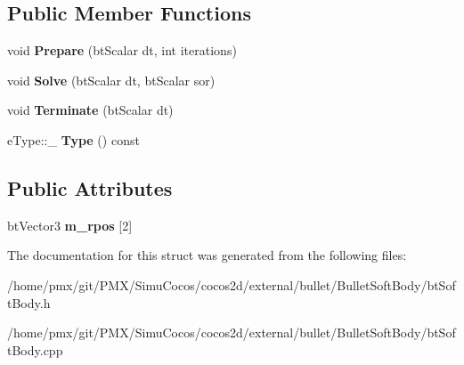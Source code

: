 \subsection*{Public Member Functions}
\begin{DoxyCompactItemize}
\item 
\mbox{\label{structbtSoftBody_1_1LJoint_aafb676d1a943fbce147eb4d8cf4c6a67}} 
void {\bfseries Prepare} (bt\+Scalar dt, int iterations)
\item 
\mbox{\label{structbtSoftBody_1_1LJoint_a641a7b24103aa03e5e3fb8eac339a592}} 
void {\bfseries Solve} (bt\+Scalar dt, bt\+Scalar sor)
\item 
\mbox{\label{structbtSoftBody_1_1LJoint_adbcf5b43c02ca4455e1731474aa823dc}} 
void {\bfseries Terminate} (bt\+Scalar dt)
\item 
\mbox{\label{structbtSoftBody_1_1LJoint_a962f1521e7de499039294385e8cf7984}} 
e\+Type\+::\+\_\+ {\bfseries Type} () const
\end{DoxyCompactItemize}
\subsection*{Public Attributes}
\begin{DoxyCompactItemize}
\item 
\mbox{\label{structbtSoftBody_1_1LJoint_a6b2a42269b6e1e439a834fa7d5491d11}} 
bt\+Vector3 {\bfseries m\+\_\+rpos} \mbox{[}2\mbox{]}
\end{DoxyCompactItemize}


The documentation for this struct was generated from the following files\+:\begin{DoxyCompactItemize}
\item 
/home/pmx/git/\+P\+M\+X/\+Simu\+Cocos/cocos2d/external/bullet/\+Bullet\+Soft\+Body/bt\+Soft\+Body.\+h\item 
/home/pmx/git/\+P\+M\+X/\+Simu\+Cocos/cocos2d/external/bullet/\+Bullet\+Soft\+Body/bt\+Soft\+Body.\+cpp\end{DoxyCompactItemize}

